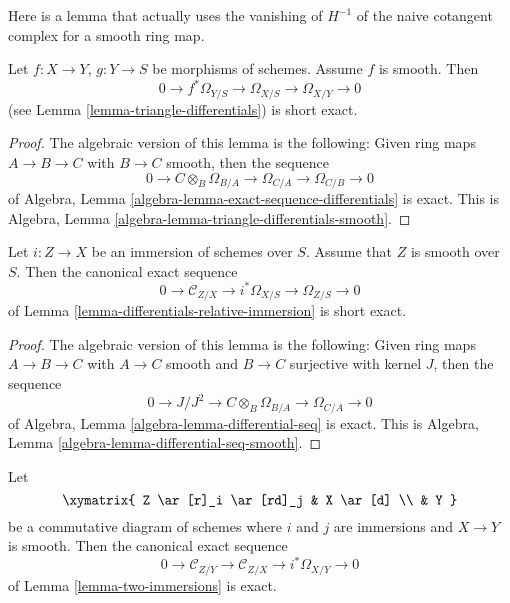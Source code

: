\noindent
Here is a lemma that actually uses the vanishing of $H^{-1}$
of the naive cotangent complex for a smooth ring map.

\begin{lemma}
\label{lemma-triangle-differentials-smooth}
Let $f : X \to Y$, $g : Y \to S$ be morphisms of schemes.
Assume $f$ is smooth. Then
$$
0 \to f^*\Omega_{Y/S} \to \Omega_{X/S} \to \Omega_{X/Y} \to 0
$$
(see Lemma \ref{lemma-triangle-differentials}) is short exact.
\end{lemma}

\begin{proof}
The algebraic version of this lemma is the following:
Given ring maps $A \to B \to C$ with $B \to C$ smooth, then the sequence
$$
0 \to C \otimes_B \Omega_{B/A} \to \Omega_{C/A} \to \Omega_{C/B} \to 0
$$
of
Algebra, Lemma \ref{algebra-lemma-exact-sequence-differentials}
is exact. This is
Algebra, Lemma \ref{algebra-lemma-triangle-differentials-smooth}.
\end{proof}

\begin{lemma}
\label{lemma-differentials-relative-immersion-smooth}
Let $i : Z \to X$ be an immersion of schemes over $S$.
Assume that $Z$ is smooth over $S$. Then the
canonical exact sequence
$$
0 \to \mathcal{C}_{Z/X} \to i^*\Omega_{X/S} \to \Omega_{Z/S} \to 0
$$
of
Lemma \ref{lemma-differentials-relative-immersion}
is short exact.
\end{lemma}

\begin{proof}
The algebraic version of this lemma is the following:
Given ring maps $A \to B \to C$ with $A \to C$ smooth and $B \to C$
surjective with kernel $J$, then the sequence
$$
0 \to J/J^2 \to C \otimes_B \Omega_{B/A} \to \Omega_{C/A} \to 0
$$
of
Algebra, Lemma \ref{algebra-lemma-differential-seq}
is exact. This is
Algebra, Lemma \ref{algebra-lemma-differential-seq-smooth}.
\end{proof}

\begin{lemma}
\label{lemma-two-immersions-smooth}
Let
$$
\xymatrix{
Z \ar[r]_i \ar[rd]_j & X \ar[d] \\
& Y
}
$$
be a commutative diagram of schemes where $i$ and $j$ are immersions
and $X \to Y$ is smooth.
Then the canonical exact sequence
$$
0 \to  \mathcal{C}_{Z/Y} \to \mathcal{C}_{Z/X} \to i^*\Omega_{X/Y} \to 0
$$
of
Lemma \ref{lemma-two-immersions}
is exact.
\end{lemma}

